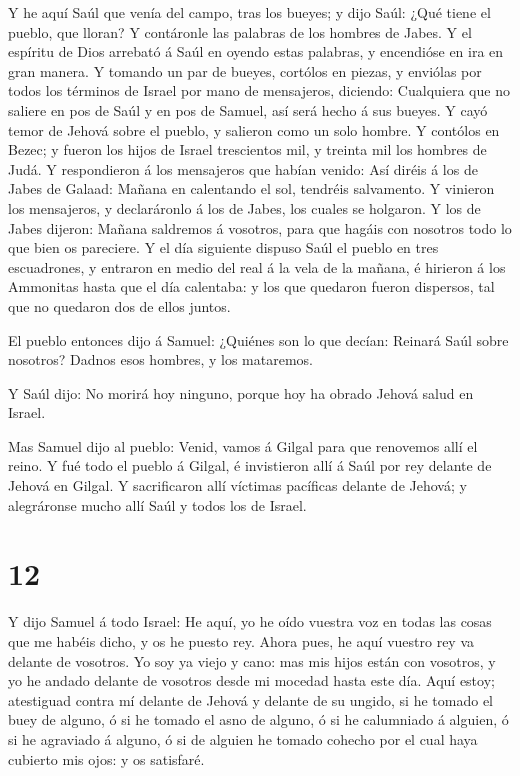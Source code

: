  Y he aquí Saúl que venía del campo, tras los bueyes; y dijo
Saúl: ¿Qué tiene el pueblo, que lloran? Y contáronle las palabras de los
hombres de Jabes.  Y el espíritu de Dios arrebató á Saúl en
oyendo estas palabras, y encendióse en ira en gran manera. 
Y tomando un par de bueyes, cortólos en piezas, y enviólas por todos los
términos de Israel por mano de mensajeros, diciendo: Cualquiera que no
saliere en pos de Saúl y en pos de Samuel, así será hecho á sus bueyes.
Y cayó temor de Jehová sobre el pueblo, y salieron como un solo hombre.
 Y contólos en Bezec; y fueron los hijos de Israel
trescientos mil, y treinta mil los hombres de Judá.  Y
respondieron á los mensajeros que habían venido: Así diréis á los de
Jabes de Galaad: Mañana en calentando el sol, tendréis salvamento. Y
vinieron los mensajeros, y declaráronlo á los de Jabes, los cuales se
holgaron.  Y los de Jabes dijeron: Mañana saldremos á
vosotros, para que hagáis con nosotros todo lo que bien os pareciere.
 Y el día siguiente dispuso Saúl el pueblo en tres
escuadrones, y entraron en medio del real á la vela de la mañana, é
hirieron á los Ammonitas hasta que el día calentaba: y los que quedaron
fueron dispersos, tal que no quedaron dos de ellos juntos.

 El pueblo entonces dijo á Samuel: ¿Quiénes son lo que
decían: Reinará Saúl sobre nosotros? Dadnos esos hombres, y los
mataremos.

 Y Saúl dijo: No morirá hoy ninguno, porque hoy ha obrado
Jehová salud en Israel.

 Mas Samuel dijo al pueblo: Venid, vamos á Gilgal para que
renovemos allí el reino.  Y fué todo el pueblo á Gilgal, é
invistieron allí á Saúl por rey delante de Jehová en Gilgal. Y
sacrificaron allí víctimas pacíficas delante de Jehová; y alegráronse
mucho allí Saúl y todos los de Israel.

\hypertarget{section-11}{%
\section{12}\label{section-11}}

 Y dijo Samuel á todo Israel: He aquí, yo he oído vuestra
voz en todas las cosas que me habéis dicho, y os he puesto rey.
 Ahora pues, he aquí vuestro rey va delante de vosotros. Yo
soy ya viejo y cano: mas mis hijos están con vosotros, y yo he andado
delante de vosotros desde mi mocedad hasta este día.  Aquí
estoy; atestiguad contra mí delante de Jehová y delante de su ungido, si
he tomado el buey de alguno, ó si he tomado el asno de alguno, ó si he
calumniado á alguien, ó si he agraviado á alguno, ó si de alguien he
tomado cohecho por el cual haya cubierto mis ojos: y os satisfaré.

